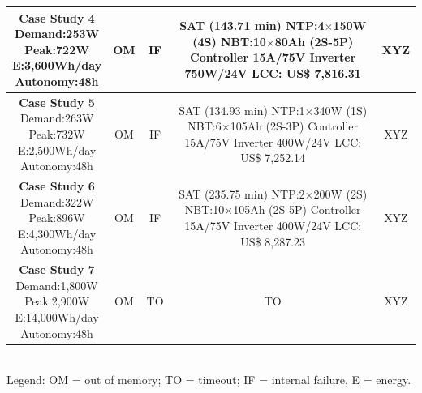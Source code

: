 \documentclass[review]{elsarticle}
\begin{document}
\begin{table}
\begin{scriptsize}
\begin{tabular}{|c|c|c|c|c|}
\hline
\makecell{\textbf{Case Study 4}\\Demand:253W\\Peak:722W\\E:3,600Wh/day\\Autonomy:48h} & OM & IF & \makecell {SAT (143.71 min) \\NTP:4$\times$150W (4S)\\NBT:10$\times$80Ah (2S-5P)\\Controller 15A/75V\\Inverter 750W/24V \\LCC: US\$ 7,816.31} & XYZ \\
\hline
\makecell{\textbf{Case Study 5}\\Demand:263W\\Peak:732W\\E:2,500Wh/day\\Autonomy:48h} & OM & IF & \makecell {SAT (134.93 min) \\NTP:1$\times$340W (1S)\\NBT:6$\times$105Ah (2S-3P)\\Controller 15A/75V\\Inverter 400W/24V \\LCC: US\$ 7,252.14} & XYZ \\
\hline
\makecell{\textbf{Case Study 6}\\Demand:322W\\Peak:896W\\E:4,300Wh/day\\Autonomy:48h} & OM & IF & \makecell {SAT (235.75 min) \\NTP:2$\times$200W (2S)\\NBT:10$\times$105Ah (2S-5P)\\Controller 15A/75V\\Inverter 400W/24V \\LCC: US\$ 8,287.23} & XYZ \\
\hline
\makecell{\textbf{Case Study 7}\\Demand:1,800W\\Peak:2,900W\\E:14,000Wh/day\\Autonomy:48h} & OM & TO & TO & XYZ \\
\hline
\hline
\end{tabular}
\\Legend: OM = out of memory; TO = timeout; IF = internal failure, E = energy.
\end{scriptsize}
\end{table}
\end{document}
